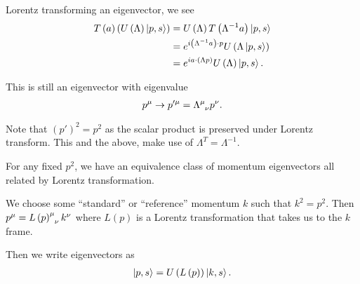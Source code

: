 Lorentz transforming an eigenvector, we see
\begin{align}
    T\left( a \right) \left( U \left( \Lambda \right) \ket{p,s} \right) &= U \left( \Lambda \right) T \left( \Lambda^{-1} a \right) \ket{p,s} \\
    &= e^{i \left( \Lambda^{-1} a \right) \cdot p} U \left( \Lambda \ket{p,s} \right)  \\
    &= e^{i a \cdot \left( \Lambda p \right) } U \left( \Lambda \right) \ket{p,s}
.\end{align}

This is still an eigenvector with eigenvalue
\begin{align}
    p^{\mu} \to p'^{\mu} = \tensor{\Lambda}{^{\mu}_\nu} p^{\nu}
.\end{align}

Note that $\left( p' \right)^2 = p^2$ as the scalar product is preserved under Lorentz transform. This and the above, make use of $\Lambda^{T} = \Lambda^{-1}$.

For any fixed $p^2$, we have an equivalence class of momentum eigenvectors all related by Lorentz transformation.

We choose some ``standard'' or ``reference'' momentum $k$ such that $k^2 = p^2$. Then $p^{\mu} = \tensor{L \left( p \right)}{^{\mu}_{\nu}}k^{\nu} $ where $L\left( p \right) $ is a Lorentz transformation that takes us to the $k$ frame.

Then we write eigenvectors as
\begin{align}
    \ket{p,s} = U \left( L \left( p \right)  \right) \ket{k,s}
.\end{align}





